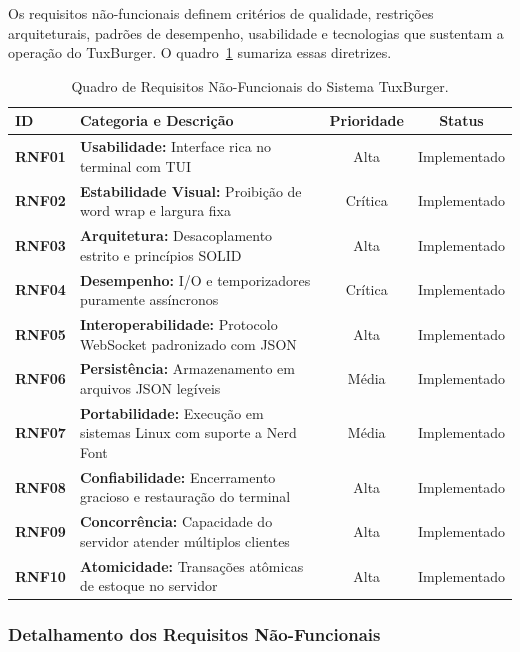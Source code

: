 \documentclass[12pt]{article}
\begin{document}
Os requisitos não-funcionais definem critérios de qualidade, restrições arquiteturais, padrões de desempenho, usabilidade e tecnologias que sustentam a operação do TuxBurger. O quadro~\ref{tab:rnf} sumariza essas diretrizes.

\begin{table}[htbp]
\centering
\small
\begin{tabularx}{\textwidth}{l X c c}
\toprule
\textbf{ID} & \textbf{Categoria e Descrição} & \textbf{Prioridade} & \textbf{Status} \\
\midrule
\textbf{RNF01} & \textbf{Usabilidade:} Interface rica no terminal com TUI & Alta & Implementado \\
\textbf{RNF02} & \textbf{Estabilidade Visual:} Proibição de word wrap e largura fixa & Crítica & Implementado \\
\textbf{RNF03} & \textbf{Arquitetura:} Desacoplamento estrito e princípios SOLID & Alta & Implementado \\
\textbf{RNF04} & \textbf{Desempenho:} I/O e temporizadores puramente assíncronos & Crítica & Implementado \\
\textbf{RNF05} & \textbf{Interoperabilidade:} Protocolo WebSocket padronizado com JSON & Alta & Implementado \\
\textbf{RNF06} & \textbf{Persistência:} Armazenamento em arquivos JSON legíveis & Média & Implementado \\
\textbf{RNF07} & \textbf{Portabilidade:} Execução em sistemas Linux com suporte a Nerd Font & Média & Implementado \\
\textbf{RNF08} & \textbf{Confiabilidade:} Encerramento gracioso e restauração do terminal & Alta & Implementado \\
\textbf{RNF09} & \textbf{Concorrência:} Capacidade do servidor atender múltiplos clientes & Alta & Implementado \\
\textbf{RNF10} & \textbf{Atomicidade:} Transações atômicas de estoque no servidor & Alta & Implementado \\
\bottomrule
\end{tabularx}
\caption{Quadro de Requisitos Não-Funcionais do Sistema TuxBurger.}
\label{tab:rnf}
\end{table}

\subsubsection{Detalhamento dos Requisitos Não-Funcionais}
\end{document}
